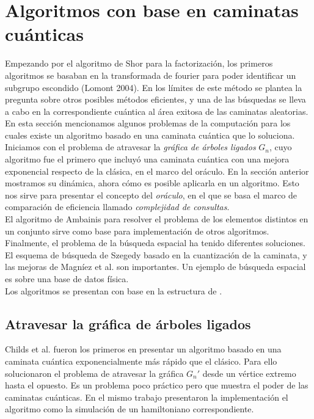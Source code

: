 
\section{Algoritmos con base en caminatas cuánticas}
Empezando por el algoritmo de Shor para la factorización, los primeros algoritmos se basaban en la transformada de fourier para poder identificar un subgrupo escondido (Lomont 2004). En los límites de este método se plantea la pregunta sobre otros posibles métodos eficientes, y una de las búsquedas se lleva a cabo en la correspondiente cuántica al área exitosa de las caminatas aleatorias.
En esta sección mencionamos algunos problemas de la computación para los cuales existe un algoritmo basado en una caminata cuántica que lo soluciona.\\

Iniciamos con el problema de atravesar la \textit{gráfica de árboles ligados} $G_n$, cuyo algoritmo fue el primero que incluyó una caminata cuántica con una mejora exponencial respecto de la clásica, en el marco del oráculo. En la sección anterior mostramos su dinámica, ahora cómo es posible aplicarla en un algoritmo. Esto nos sirve para presentar el concepto del \textit{oráculo}, en el que se basa el marco de comparación de eficiencia llamado \textit{complejidad de consultas}.\\

El algoritmo de Ambainis \cite{ambainis2007quantum} para resolver el problema de los elementos distintos en un conjunto sirve como base para implementación de otros algoritmos. Finalmente, el problema de la búsqueda espacial ha tenido diferentes soluciones. El esquema de búsqueda de Szegedy \cite{szegedy2004quantum} basado en la cuantización de la caminata, y las mejoras de Magníez et al. \cite{magniez2011search} son importantes. Un ejemplo de búsqueda espacial es sobre una base de datos física.\\

Los algoritmos se presentan con base en la estructura de \cite{shao}.
\subsection{Atravesar la gráfica de árboles ligados}
Childs et al. \cite{childs2003exponential} fueron los primeros en presentar un algoritmo basado en una caminata cuántica exponencialmente más rápido que el clásico. Para ello solucionaron el problema de atravesar la gráfica $G_n'$ desde un vértice extremo hasta el opuesto. Es un problema poco práctico pero que muestra el poder de las caminatas cuánticas. En el mismo trabajo presentaron la implementación el algoritmo como la simulación de un hamiltoniano correspondiente. \\ 

